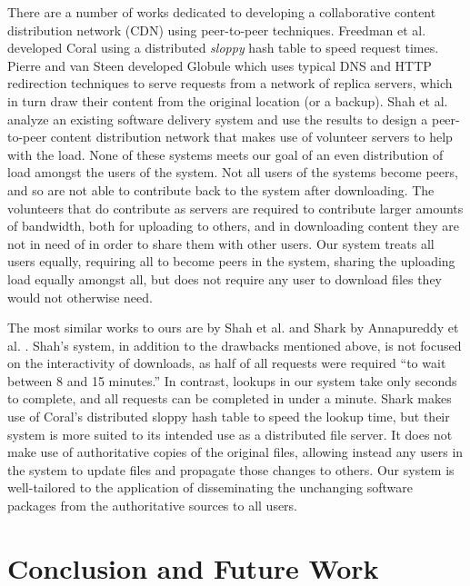\documentclass[conference]{IEEEtran}
\begin{document}
There are a number of works dedicated to developing a collaborative
content distribution network (CDN) using peer-to-peer techniques.
Freedman et al. developed Coral \cite{coral} using a distributed
\emph{sloppy} hash table to speed request times. Pierre and van
Steen developed Globule \cite{globule} which uses typical DNS and
HTTP redirection techniques to serve requests from a network of
replica servers, which in turn draw their content from the original
location (or a backup). Shah et al. \cite{shah08} analyze an
existing software delivery system and use the results to design a
peer-to-peer content distribution network that makes use of
volunteer servers to help with the load. None of these systems meets
our goal of an even distribution of load amongst the users of the
system. Not all users of the systems become peers, and so are not
able to contribute back to the system after downloading. The
volunteers that do contribute as servers are required to contribute
larger amounts of bandwidth, both for uploading to others, and in
downloading content they are not in need of in order to share them
with other users. Our system treats all users equally, requiring all
to become peers in the system, sharing the uploading load equally
amongst all, but does not require any user to download files they
would not otherwise need.

The most similar works to ours are by Shah et al. \cite{shah08} and
Shark by Annapureddy et al. \cite{shark}.
Shah's system, in addition to the drawbacks mentioned above,
is not focused on the interactivity of downloads, as
half of all requests were required ``to wait between 8 and 15
minutes.'' In contrast, lookups in our system take only seconds to
complete, and all requests can be completed in under a minute.
Shark makes use of Coral's distributed sloppy hash table to speed
the lookup time, but their system is more suited to its intended use
as a distributed file server. It does not make use of authoritative
copies of the original files, allowing instead any users in the
system to update files and propagate those changes to others. Our
system is well-tailored to the application of disseminating the
unchanging software packages from the authoritative sources to all
users.



\section{Conclusion and Future Work}
\label{conclusions}
\end{document}
